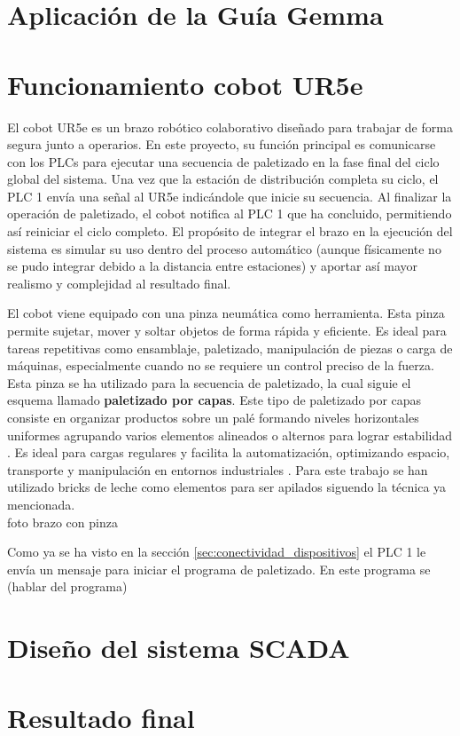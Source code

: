 \section{Aplicación de la Guía Gemma}
\label{sec:aplicacion_gemma}


\clearpage

\section{Funcionamiento cobot UR5e}
\label{sec:funcionamiento_ur5e}

El cobot UR5e es un brazo robótico colaborativo diseñado para trabajar de forma segura junto a operarios. En este proyecto, su función principal es comunicarse con los PLCs para ejecutar una secuencia de paletizado en la fase final del ciclo global del sistema. Una vez que la estación de distribución completa su ciclo, el PLC 1 envía una señal al UR5e indicándole que inicie su secuencia. Al finalizar la operación de paletizado, el cobot notifica al PLC 1 que ha concluido, permitiendo así reiniciar el ciclo completo. El propósito de integrar el brazo en la ejecución del sistema es simular su uso dentro del proceso automático (aunque físicamente no se pudo integrar debido a la distancia entre estaciones) y aportar así mayor realismo y complejidad al resultado final. 

El cobot viene equipado con una pinza neumática como herramienta. Esta pinza permite sujetar, mover y soltar objetos de forma rápida y eficiente. Es ideal para tareas repetitivas como ensamblaje, paletizado, manipulación de piezas o carga de máquinas, especialmente cuando no se requiere un control preciso de la fuerza. Esta pinza se ha utilizado para la secuencia de paletizado, la cual siguie el esquema llamado \textbf{paletizado por capas}. Este tipo de paletizado por capas consiste en organizar productos sobre un palé formando niveles horizontales uniformes agrupando varios elementos alineados o alternos para lograr estabilidad \cite{paletizado_capas}. Es ideal para cargas regulares y facilita la automatización, optimizando espacio, transporte y manipulación en entornos industriales \cite{paletizado_capas}. Para este trabajo se han utilizado bricks de leche como elementos para ser apilados siguendo la técnica ya mencionada. \\

foto brazo con pinza
\clearpage

Como ya se ha visto en la sección \ref{sec:conectividad_dispositivos} el PLC 1 le envía un mensaje para iniciar el programa de paletizado. En este programa se (hablar del programa)


\clearpage
\section{Diseño del sistema SCADA}
\label{sec:diseño_scada}



\section{Resultado final}
\label{sec:resultado_final}





